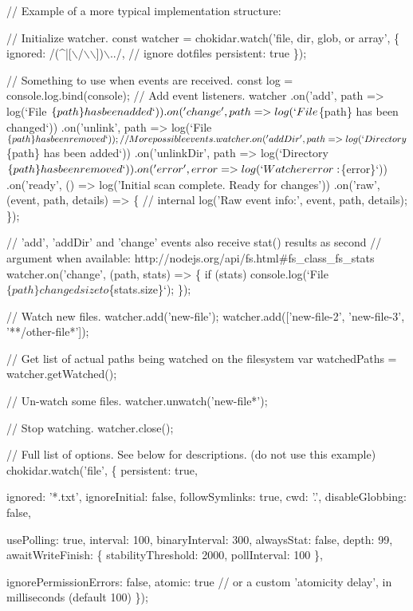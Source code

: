 \begin{DoxyCode}
// Example of a more typical implementation structure:

// Initialize watcher.
const watcher = chokidar.watch('file, dir, glob, or array', \{
  ignored: /(^|[\(\backslash\)/\(\backslash\)\(\backslash\)])\(\backslash\)../, // ignore dotfiles
  persistent: true
\});

// Something to use when events are received.
const log = console.log.bind(console);
// Add event listeners.
watcher
  .on('add', path => log(`File $\{path\} has been added`))
  .on('change', path => log(`File $\{path\} has been changed`))
  .on('unlink', path => log(`File $\{path\} has been removed`));

// More possible events.
watcher
  .on('addDir', path => log(`Directory $\{path\} has been added`))
  .on('unlinkDir', path => log(`Directory $\{path\} has been removed`))
  .on('error', error => log(`Watcher error: $\{error\}`))
  .on('ready', () => log('Initial scan complete. Ready for changes'))
  .on('raw', (event, path, details) => \{ // internal
    log('Raw event info:', event, path, details);
  \});

// 'add', 'addDir' and 'change' events also receive stat() results as second
// argument when available: http://nodejs.org/api/fs.html#fs\_class\_fs\_stats
watcher.on('change', (path, stats) => \{
  if (stats) console.log(`File $\{path\} changed size to $\{stats.size\}`);
\});

// Watch new files.
watcher.add('new-file');
watcher.add(['new-file-2', 'new-file-3', '**/other-file*']);

// Get list of actual paths being watched on the filesystem
var watchedPaths = watcher.getWatched();

// Un-watch some files.
watcher.unwatch('new-file*');

// Stop watching.
watcher.close();

// Full list of options. See below for descriptions. (do not use this example)
chokidar.watch('file', \{
  persistent: true,

  ignored: '*.txt',
  ignoreInitial: false,
  followSymlinks: true,
  cwd: '.',
  disableGlobbing: false,

  usePolling: true,
  interval: 100,
  binaryInterval: 300,
  alwaysStat: false,
  depth: 99,
  awaitWriteFinish: \{
    stabilityThreshold: 2000,
    pollInterval: 100
  \},

  ignorePermissionErrors: false,
  atomic: true // or a custom 'atomicity delay', in milliseconds (default 100)
\});
\end{DoxyCode}


